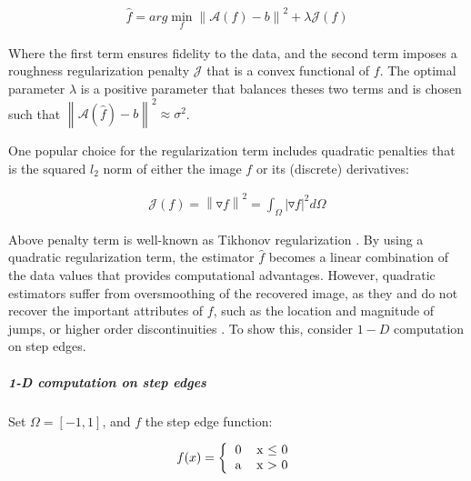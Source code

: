 \begin{equation}
\label{eq:nonweightedregularization}
\begin{gathered}
\widehat{f} = arg\min_{f}\left\|\mathcal{A}(f)-b\right\|^{2} + \lambda\mathcal{J}(f)
\end{gathered}
\end{equation}


Where the first term ensures fidelity to the data, and the second term imposes a roughness regularization penalty $\mathcal{J}$ that is a convex functional of $f$.
The optimal parameter $\lambda$ is a positive parameter that balances theses two terms and is chosen such that $\left\|\mathcal{A}(\hat{f})-b\right\|^{2} \approx \sigma^{2}$.

One popular choice for the regularization term includes quadratic penalties \cite{tikhonov1943stability} that is the squared $l_{2}$ norm of either the image $f$ or its (discrete) derivatives:

\begin{equation}
\begin{gathered}
\mathcal{J}(f) = \left\|\triangledown f\right\|^{2} = \int_{\Omega} |\triangledown f|^2 d\Omega
\end{gathered}
\end{equation}

Above penalty term is well-known as Tikhonov regularization \cite{tikhonov1977solutions}. By using a quadratic regularization term, the estimator $\widehat{f}$ becomes a linear combination of the data values that provides computational advantages. However, quadratic estimators suffer from oversmoothing of the recovered image, as they and do not recover the important attributes of $f$, such as the location and magnitude of jumps, or higher order discontinuities \cite{geman95}. To show this, consider $1-D$ computation on step edges.

\subparagraph{1-D computation on step edges} %
Set $\Omega = [-1,1]$, and $f$ the step edge function:

\begin{equation}
\begin{gathered}
f(x) = 
\left \{
  \begin{tabular}{cc}
  0 & x $\leq$ 0 \\
  a & x $>$ 0
  \end{tabular}
\right.
\end{gathered}
\end{equation}

